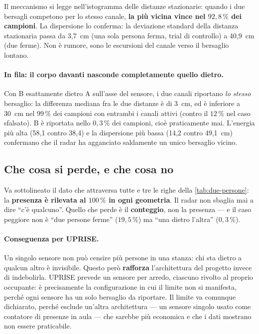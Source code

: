 Il meccanismo si legge nell'istogramma delle distanze stazionarie: quando i due
bersagli competono per lo stesso canale, \textbf{la più vicina vince nel $92{,}8\,\%$
dei campioni}. La dispersione lo conferma: la deviazione standard della distanza
stazionaria passa da 3,7~cm (una sola persona ferma, trial di controllo) a 40,9~cm
(due ferme). Non è rumore, sono le escursioni del canale verso il bersaglio lontano.

\paragraph{In fila: il corpo davanti nasconde completamente quello dietro.} Con B
esattamente dietro A sull'asse del sensore, i due canali riportano \emph{lo stesso}
bersaglio: la differenza mediana fra le due distanze è di 3~cm, ed è inferiore a 30~cm
nel $99\,\%$ dei campioni con entrambi i canali attivi (contro il $12\,\%$ nel caso
sfalsato). B è riportata nello $0{,}3\,\%$ dei campioni, cioè praticamente mai.
L'energia più alta (58,1 contro 38,4) e la dispersione più bassa (14,2 contro 49,1~cm)
confermano che il radar ha agganciato saldamente un unico bersaglio vicino.

\subsection{Che cosa si perde, e che cosa no}

Va sottolineato il dato che attraversa tutte e tre le righe della
\cref{tab:due-persone}: la \textbf{presenza è rilevata al $100\,\%$ in ogni
geometria}. Il radar non sbaglia mai a dire ``c'è qualcuno''. Quello che perde è il
\textbf{conteggio}, non la presenza --- e il caso peggiore non è ``due persone ferme''
($19{,}5\,\%$) ma ``una dietro l'altra'' ($0{,}3\,\%$).

\paragraph{Conseguenza per UPRISE.} Un singolo sensore non può censire più persone in
una stanza: chi sta dietro a qualcun altro è invisibile. Questo però
\textbf{rafforza} l'architettura del progetto invece di indebolirla. UPRISE prevede un
sensore per arredo, ciascuno rivolto al proprio occupante: è precisamente la
configurazione in cui il limite non si manifesta, perché ogni sensore ha un solo
bersaglio da riportare. Il limite va comunque dichiarato, perché esclude un'altra
architettura --- un sensore singolo usato come contatore di presenze in aula --- che
sarebbe più economica e che i dati mostrano non essere praticabile.

